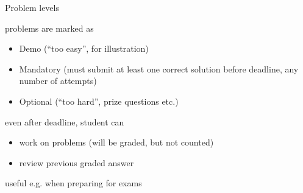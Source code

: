 \begin{slide}{Problem levels}

problems are marked as
\begin{itemize}
\item Demo (``too easy'', for illustration)
\item Mandatory (must submit at least one correct solution before deadline,
  any number of attempts)
\item Optional (``too hard'', prize questions etc.)
\end{itemize}

even after deadline, student can
\begin{itemize}
\item
  work on problems (will be graded, but not counted)
\item
  review previous graded answer
\end{itemize}
useful e.g. when preparing for exams

\end{slide}
